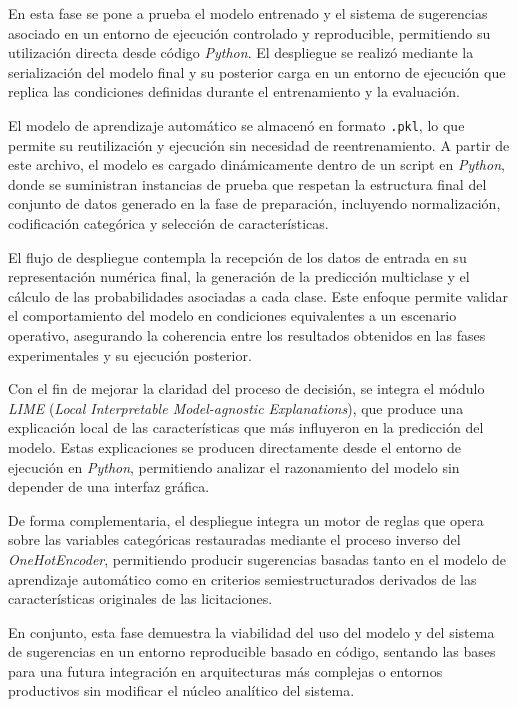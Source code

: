 \documentclass[a4paper,fleqn]{cas-sc}
\begin{document}
	En esta fase se pone a prueba el modelo entrenado y el sistema de sugerencias asociado en un entorno de ejecución controlado y reproducible, permitiendo su utilización directa desde código \textit{Python}. 
	El despliegue se realizó mediante la serialización del modelo final y su posterior carga en un entorno de ejecución que replica las condiciones definidas durante el entrenamiento y la evaluación.
	
	El modelo de aprendizaje automático se almacenó en formato \texttt{.pkl}, lo que permite su reutilización y ejecución sin necesidad de reentrenamiento. 
	A partir de este archivo, el modelo es cargado dinámicamente dentro de un script en \textit{Python}, donde se suministran instancias de prueba que respetan la estructura final del conjunto de datos generado en la fase de preparación, incluyendo normalización, codificación categórica y selección de características.
	
	El flujo de despliegue contempla la recepción de los datos de entrada en su representación numérica final, la generación de la predicción multiclase y el cálculo de las probabilidades asociadas a cada clase. 
	Este enfoque permite validar el comportamiento del modelo en condiciones equivalentes a un escenario operativo, asegurando la coherencia entre los resultados obtenidos en las fases experimentales y su ejecución posterior.
	
	
	
Con el fin de mejorar la claridad del proceso de decisión, 
se integra el módulo \textit{LIME} (\textit{Local Interpretable Model-agnostic Explanations}), que produce una explicación local de las características que más influyeron en la predicción del modelo.	 	Estas explicaciones se producen directamente desde el entorno de ejecución en \textit{Python}, permitiendo analizar el razonamiento del modelo sin depender de una interfaz gráfica.
		
	De forma complementaria, el despliegue 
integra un motor de reglas que opera sobre las variables categóricas restauradas mediante el proceso inverso del \textit{OneHotEncoder}, permitiendo producir sugerencias basadas tanto en el modelo de aprendizaje automático como en criterios semiestructurados derivados de las características originales de las licitaciones.	
	
	En conjunto, esta fase demuestra la viabilidad del uso del modelo y del sistema de sugerencias en un entorno reproducible basado en código, sentando las bases para una futura integración en arquitecturas más complejas o entornos productivos sin modificar el núcleo analítico del sistema.
	
\end{document}
